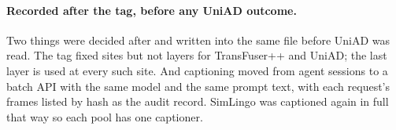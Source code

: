 \paragraph{Recorded after the tag, before any UniAD outcome.}
Two things were decided after  and written into the same
file before UniAD was read. The tag fixed sites but not layers for TransFuser++
and UniAD; the last layer is used at every such site. And captioning moved from
agent sessions to a batch API with the same model and the same prompt text, with
each request's frames listed by hash as the audit record. SimLingo was captioned
again in full that way so each pool has one captioner.
